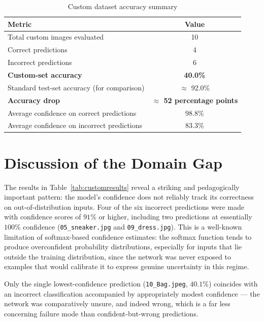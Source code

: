 \documentclass[12pt,a4paper]{report}
\begin{document}
\begin{table}[H]
\centering
\caption{Custom dataset accuracy summary}
\label{tab:customsummary}
\begin{tabular}{@{}lc@{}}
\toprule
\textbf{Metric} & \textbf{Value} \\
\midrule
Total custom images evaluated & 10 \\
Correct predictions & 4 \\
Incorrect predictions & 6 \\
\textbf{Custom-set accuracy} & \textbf{40.0\%} \\
Standard test-set accuracy (for comparison) & $\approx$ 92.0\% \\
\textbf{Accuracy drop} & \textbf{$\approx$ 52 percentage points} \\
Average confidence on correct predictions & 98.8\% \\
Average confidence on incorrect predictions & 83.3\% \\
\bottomrule
\end{tabular}
\end{table}

\section{Discussion of the Domain Gap}
The results in Table~\ref{tab:customresults} reveal a striking and pedagogically important pattern: the model's confidence does not reliably track its correctness on out-of-distribution inputs. Four of the six incorrect predictions were made with confidence scores of $91\%$ or higher, including two predictions at essentially $100\%$ confidence (\texttt{05\_sneaker.jpg} and \texttt{09\_dress.jpg}). This is a well-known limitation of softmax-based confidence estimates: the softmax function tends to produce overconfident probability distributions, especially for inputs that lie outside the training distribution, since the network was never exposed to examples that would calibrate it to express genuine uncertainty in this regime.

Only the single lowest-confidence prediction (\texttt{10\_Bag.jpeg}, $40.1\%$) coincides with an incorrect classification accompanied by appropriately modest confidence — the network was comparatively unsure, and indeed wrong, which is a far less concerning failure mode than confident-but-wrong predictions.
\end{document}
